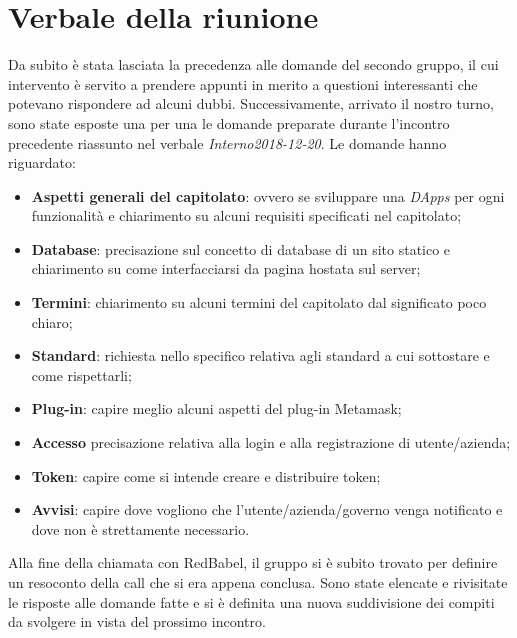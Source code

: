 \section{Verbale della riunione}

Da subito è stata lasciata la precedenza alle domande del secondo gruppo, il cui intervento è servito a prendere appunti in merito a questioni interessanti che potevano rispondere ad alcuni dubbi.\newline
Successivamente, arrivato il nostro turno, sono state esposte una per una le domande preparate durante l'incontro precedente riassunto nel verbale \textit{Interno2018-12-20}.\newline
Le domande hanno riguardato:
\begin{itemize}
	\item \textbf{Aspetti generali del capitolato}: ovvero se sviluppare una \textit{DApps} per ogni funzionalità e chiarimento su alcuni requisiti specificati nel capitolato;
	\item \textbf{Database}: precisazione sul concetto di database di un sito statico e chiarimento su come interfacciarsi da pagina hostata sul server;
	\item \textbf{Termini}: chiarimento su alcuni termini del capitolato dal significato poco chiaro;
	\item \textbf{Standard}: richiesta nello specifico relativa agli standard a cui sottostare e come rispettarli;
	\item \textbf{Plug-in}: capire meglio alcuni aspetti del plug-in Metamask;
	\item \textbf{Accesso} precisazione relativa alla login e alla registrazione di utente/azienda;
	\item \textbf{Token}: capire come si intende creare e distribuire token;
	\item \textbf{Avvisi}: capire dove vogliono che l'utente/azienda/governo venga notificato e dove non è strettamente necessario.
\end{itemize}
Alla fine della chiamata con RedBabel, il gruppo si è subito trovato per definire un resoconto della call che si era appena conclusa. Sono state elencate e rivisitate le risposte alle domande fatte e si è definita una nuova suddivisione dei compiti da svolgere in vista del prossimo incontro.
\pagebreak

